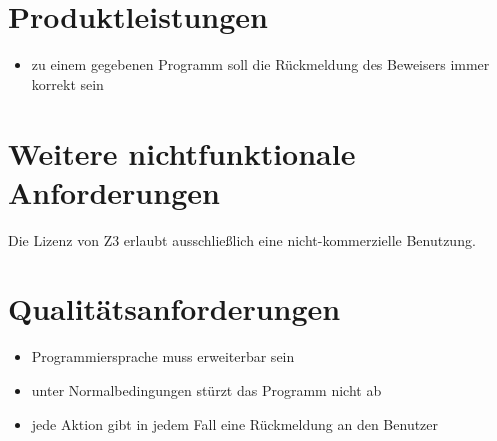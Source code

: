 \documentclass[a4paper,10pt]{article}
\begin{document}
\section{Produktleistungen}
\begin{itemize}
  \item zu einem gegebenen Programm soll die Rückmeldung des Beweisers immer korrekt sein
\end{itemize}

\section{Weitere nichtfunktionale Anforderungen}
Die Lizenz von Z3 erlaubt ausschließlich eine nicht-kommerzielle Benutzung.

\section{Qualitätsanforderungen}
\begin{itemize}
  \item Programmiersprache muss erweiterbar sein
  \item unter Normalbedingungen stürzt das Programm nicht ab
  \item jede Aktion gibt in jedem Fall eine Rückmeldung an den Benutzer
\end{itemize}
\end{document}

